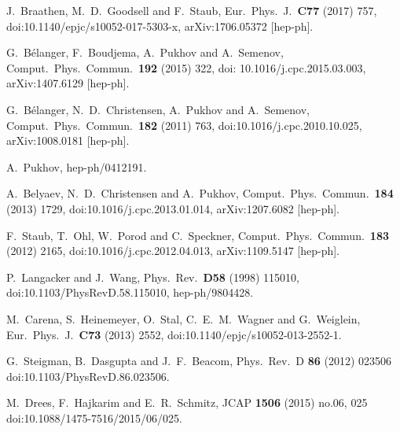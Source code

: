 \documentclass[a4paper,11pt]{article}
\begin{document}
\begin{thebibliography}{99}
J.~Braathen, M.~D.~Goodsell and F.~Staub,
Eur.\ Phys.\ J.\ {\bf C77} (2017) 757,
doi:10.1140/epjc/s10052-017-5303-x,
arXiv:1706.05372 [hep-ph].

G.~B\'elanger, F.~Boudjema, A.~Pukhov and A.~Semenov,
Comput.\ Phys.\ Commun.\  {\bf 192} (2015) 322, 
doi: 10.1016/j.cpc.2015.03.003,
arXiv:1407.6129 [hep-ph].

G.~B\'elanger, N.~D.~Christensen, A.~Pukhov and A.~Semenov,
Comput.\ Phys.\ Commun.\  {\bf 182} (2011) 763, 
doi:10.1016/j.cpc.2010.10.025,
arXiv:1008.0181 [hep-ph].

A.~Pukhov,
hep-ph/0412191.

A.~Belyaev, N.~D.~Christensen and A.~Pukhov,
Comput.\ Phys.\ Commun.\  {\bf 184} (2013) 1729,
doi:10.1016/j.cpc.2013.01.014, 
arXiv:1207.6082 [hep-ph].

F.~Staub, T.~Ohl, W.~Porod and C.~Speckner,
Comput.\ Phys.\ Commun.\  {\bf 183} (2012) 2165, 
doi:10.1016/j.cpc.2012.04.013,
arXiv:1109.5147 [hep-ph].

P.~Langacker and J.~Wang, 
Phys.\ Rev.\ {\bf D58} (1998) 115010, 
doi:10.1103/PhysRevD.58.115010,
hep-ph/9804428.

M.~Carena, S.~Heinemeyer, O.~Stal, C.~E.~M.~Wagner and G.~Weiglein,
Eur.\ Phys.\ J.\ {\bf C73} (2013) 2552,
doi:10.1140/epjc/s10052-013-2552-1.

  G.~Steigman, B.~Dasgupta and J.~F.~Beacom,
  Phys.\ Rev.\ D {\bf 86} (2012) 023506
  doi:10.1103/PhysRevD.86.023506.

M.~Drees, F.~Hajkarim and E.~R.~Schmitz,
  JCAP {\bf 1506} (2015) no.06,  025
  doi:10.1088/1475-7516/2015/06/025.


\end{thebibliography}
\end{document}
